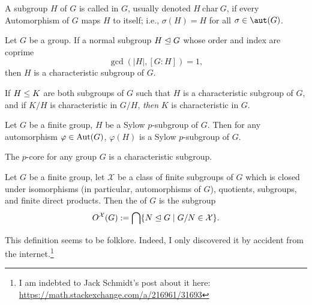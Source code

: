 \begin{definition}
A subgroup $H$ of $G$ is called  in $G$, usually
denoted $H~\mathrm{char}~G$, if every Automorphism of $G$ maps $H$ to
itself; i.e., $\sigma(H)=H$ for all $\sigma\in\aut(G)$.
\end{definition}

\begin{theorem}
Let $G$ be a group. If a normal subgroup $H\trianglelefteq G$ whose
order and index are coprime
\begin{equation*}
\gcd(|H|, [G:H])=1,
\end{equation*}
then $H$ is a characteristic subgroup of $G$.
\end{theorem}

\begin{theorem}
If  $H\leq K$ are both subgroups of $G$ such that $H$ is
a characteristic subgroup of $G$, and if $K/H$ is characteristic in
$G/H$, \emph{then} $K$ is characteristic in $G$.
\end{theorem}

\begin{lemma}
Let $G$ be a finite group, $H$ be a Sylow $p$-subgroup of $G$. Then for
any automorphism $\varphi\in\operatorname{Aut}(G)$, $\varphi(H)$ is a Sylow
$p$-subgroup of $G$.
\end{lemma}

\begin{theorem}
The $p$-core for any group $G$ is a characteristic subgroup.
\end{theorem}

\begin{definition}\label{defn:pure-math:X-residual}
Let $G$ be a finite group, let $\mathcal{X}$ be a class of finite
subgroups of $G$ which is closed under isomorphisms (in particular,
automorphisms of $G$), quotients, subgroups, and finite direct products.
Then the  of $G$ is the subgroup
\begin{equation}
  O^{\mathcal{X}}(G) := \bigcap\{N\trianglelefteq G\mid G/N\in\mathcal{X}\}.
\end{equation}
\end{definition}

\begin{def-remark}
This definition seems to be folklore. Indeed, I only discovered it by
accident from the internet.\footnote{I am indebted to Jack Schmidt's
post about it here: \url{https://math.stackexchange.com/a/216961/31693}}
\end{def-remark}

